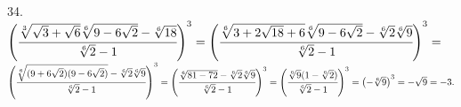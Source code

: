 34. $\left(\cfrac{\sqrt[3]{\sqrt{3}+\sqrt{6}}\sqrt[6]{9-6\sqrt{2}}-\sqrt[6]{18}}{\sqrt[6]{2}-1}\right)^3=
\left(\cfrac{\sqrt[6]{3+2\sqrt{18}+6}\sqrt[6]{9-6\sqrt{2}}-\sqrt[6]{2}\sqrt[6]{9}}{\sqrt[6]{2}-1}\right)^3=$\\$
\left(\cfrac{\sqrt[6]{(9+6\sqrt{2})(9-6\sqrt{2})}-\sqrt[6]{2}\sqrt[6]{9}}{\sqrt[6]{2}-1}\right)^3=
\left(\cfrac{\sqrt[6]{81-72}-\sqrt[6]{2}\sqrt[6]{9}}{\sqrt[6]{2}-1}\right)^3=
\left(\cfrac{\sqrt[6]{9}(1-\sqrt[6]{2})}{\sqrt[6]{2}-1}\right)^3=
\left(-\sqrt[6]{9}\right)^3=-\sqrt{9}=-3.$\\
